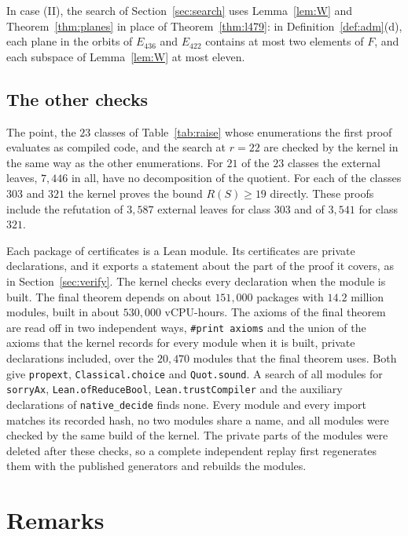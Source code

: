 \documentclass[11pt]{amsart}
\theoremstyle{definition}
\theoremstyle{remark}
\numberwithin{equation}{section}
\begin{document}
In case (II), the search of Section~\ref{sec:search} uses Lemma~\ref{lem:W} and Theorem~\ref{thm:planes} in place of Theorem~\ref{thm:l479}: in Definition~\ref{def:adm}(d), each plane in the orbits of $E_{436}$ and $E_{422}$ contains at most two elements of $F$, and each subspace of Lemma~\ref{lem:W} at most eleven.

\subsection{The other checks}
The point, the $23$ classes of Table~\ref{tab:raise} whose enumerations the first proof evaluates as compiled code, and the search at $r=22$ are checked by the kernel in the same way as the other enumerations. For $21$ of the $23$ classes the external leaves, $7{,}446$ in all, have no decomposition of the quotient. For each of the classes $303$ and $321$ the kernel proves the bound $R(S)\ge 19$ directly. These proofs include the refutation of $3{,}587$ external leaves for class $303$ and of $3{,}541$ for class $321$.

Each package of certificates is a Lean module. Its certificates are private declarations, and it exports a statement about the part of the proof it covers, as in Section~\ref{sec:verify}. The kernel checks every declaration when the module is built. The final theorem depends on about $151{,}000$ packages with $14.2$ million modules, built in about $530{,}000$ vCPU-hours. The axioms of the final theorem are read off in two independent ways, \texttt{\#print axioms} and the union of the axioms that the kernel records for every module when it is built, private declarations included, over the $20{,}470$ modules that the final theorem uses. Both give \texttt{propext}, \texttt{Classical.choice} and \texttt{Quot.sound}. A search of all modules for \texttt{sorryAx}, \texttt{Lean.ofReduceBool}, \texttt{Lean.trustCompiler} and the auxiliary declarations of \texttt{native\_decide} finds none. Every module and every import matches its recorded hash, no two modules share a name, and all modules were checked by the same build of the kernel. The private parts of the modules were deleted after these checks, so a complete independent replay first regenerates them with the published generators and rebuilds the modules.

\section{Remarks}\label{sec:remarks}
\end{document}
